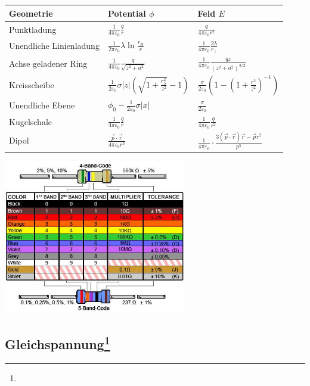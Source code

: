 \documentclass[12pt,a4paper]{article}
\newcommand{\abs}[1]{\left| #1 \right|}
\renewcommand{\=}[1]{\stackrel{#1}{=}}
\theoremstyle{definition}
\theoremstyle{remark}
\begin{document}
\noindent \begin{tabular}{lll}
\toprule
Geometrie & Potential $\phi$ & Feld $E$\\
\midrule
Punktladung & $\frac{1}{4\pi\varepsilon_0} \frac{q}{r}$ & $\frac{q}{4\pi \varepsilon_0 r^2}$\\
Unendliche Linienladung & $\frac{1}{2\pi\varepsilon_0} \lambda \ln\frac{r_B}{r}$ & $\frac{1}{4\pi\varepsilon_0} \frac{2\lambda}{r_{\perp}}$\\
Achse geladener Ring & $\frac{1}{4\pi\varepsilon_0} \frac{q}{\sqrt{z^2 + a^2 }}$ & $\frac{1}{4\pi\varepsilon_0} \frac{qz}{(z^2 +a^2)^{3/2}}$\\
Kreisscheibe & $\frac{1}{2 \varepsilon_0} \sigma \abs{z} (\sqrt{1+\frac{r_S^2}{z^2}}-1)$ & $\frac{\sigma}{2 \varepsilon_0} (1-(1+\frac{r^2}{z^2})^{-1})$\\
Unendliche Ebene & $\phi_0 - \frac{1}{2\varepsilon_0} \sigma \abs{x}$ & $\frac{\sigma}{2 \varepsilon_0}$\\
Kugelschale & $\frac{1}{4\pi\varepsilon_0} \frac{q}{r}$ & $\frac{1}{4\pi\varepsilon_0}\frac{q}{r^2}$\\
Dipol & $\frac{\vec p \cdot \vec r}{4\pi \varepsilon_0 r^3}$ & $\frac{1}{4\pi \varepsilon_0} \cdot \frac{3(\vec p \cdot \vec r)\vec r - \vec p r^2}{p^5}$\\
\bottomrule
\end{tabular}

\includegraphics[width=0.6\textwidth]{pic/resistors.jpg}
\subsection[Gleichspannung]{Gleichspannung\let\thefootnote\relax\footnote{}}
\end{document}

